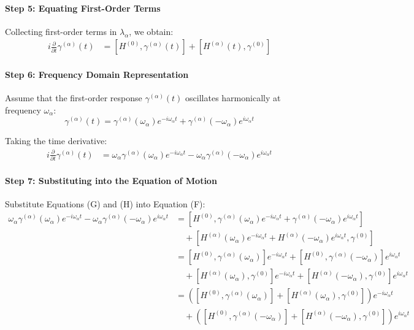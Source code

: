 \documentclass[12pt]{article}
\begin{document}
\paragraph{Step 5: Equating First-Order Terms}

Collecting first-order terms in \( \lambda_{\alpha} \), we obtain:
\begin{align}
i \frac{\partial}{\partial t} \gamma^{(\alpha)}(t) &= [H^{(0)}, \gamma^{(\alpha)}(t)] + [H^{(\alpha)}(t), \gamma^{(0)}] \end{align}

\paragraph{Step 6: Frequency Domain Representation}

Assume that the first-order response \( \gamma^{(\alpha)}(t) \) oscillates harmonically at frequency \( \omega_{\alpha} \):
\begin{equation}
\gamma^{(\alpha)}(t) = \gamma^{(\alpha)}(\omega_{\alpha}) e^{-i \omega_{\alpha} t} + \gamma^{(\alpha)}(-\omega_{\alpha}) e^{i \omega_{\alpha} t} \end{equation}

Taking the time derivative:
\begin{align}
i \frac{\partial}{\partial t} \gamma^{(\alpha)}(t) &= \omega_{\alpha} \gamma^{(\alpha)}(\omega_{\alpha}) e^{-i \omega_{\alpha} t} - \omega_{\alpha} \gamma^{(\alpha)}(-\omega_{\alpha}) e^{i \omega_{\alpha} t} \end{align}

\paragraph{Step 7: Substituting into the Equation of Motion}

Substitute Equations (G) and (H) into Equation (F):
\begin{align}
\omega_{\alpha} \gamma^{(\alpha)}(\omega_{\alpha}) e^{-i \omega_{\alpha} t} - \omega_{\alpha} \gamma^{(\alpha)}(-\omega_{\alpha}) e^{i \omega_{\alpha} t} &= [H^{(0)}, \gamma^{(\alpha)}(\omega_{\alpha}) e^{-i \omega_{\alpha} t} + \gamma^{(\alpha)}(-\omega_{\alpha}) e^{i \omega_{\alpha} t}] \nonumber \\
&\quad + [H^{(\alpha)}(\omega_{\alpha}) e^{-i \omega_{\alpha} t} + H^{(\alpha)}(-\omega_{\alpha}) e^{i \omega_{\alpha} t}, \gamma^{(0)}] \nonumber \\
&= [H^{(0)}, \gamma^{(\alpha)}(\omega_{\alpha})] e^{-i \omega_{\alpha} t} + [H^{(0)}, \gamma^{(\alpha)}(-\omega_{\alpha})] e^{i \omega_{\alpha} t} \nonumber \\
&\quad + [H^{(\alpha)}(\omega_{\alpha}), \gamma^{(0)}] e^{-i \omega_{\alpha} t} + [H^{(\alpha)}(-\omega_{\alpha}), \gamma^{(0)}] e^{i \omega_{\alpha} t} \nonumber \\
&= \left( [H^{(0)}, \gamma^{(\alpha)}(\omega_{\alpha})] + [H^{(\alpha)}(\omega_{\alpha}), \gamma^{(0)}] \right) e^{-i \omega_{\alpha} t} \nonumber \\
&\quad + \left( [H^{(0)}, \gamma^{(\alpha)}(-\omega_{\alpha})] + [H^{(\alpha)}(-\omega_{\alpha}), \gamma^{(0)}] \right) e^{i \omega_{\alpha} t} \nonumber
\end{align}
\end{document}
